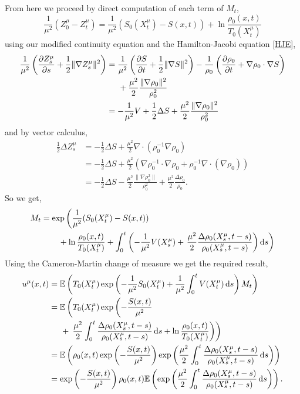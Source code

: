 \documentclass[a4paper,12pt,draft]{report}
\begin{document}
{From here we proceed by direct computation of each term of $M_t$,
$$
\frac{1}{\mu^2}(Z_0^\mu - Z_t^\mu) = \frac{1}{\mu^2}(S_0(X_t^\mu) - S(x, t)) + \ln\frac{\rho_0(x, t)}{T_0(X_t^\mu)}
$$
using our modified continuity equation and the Hamilton-Jacobi equation \eqref{HJE},
\begin{align}
\frac{1}{\mu^2}\left(\frac{\partial Z_s^\mu}{\partial s} + \frac{1}{2}\|\nabla Z_s^\mu\|^2\right) & = \frac{1}{\mu^2}\left(\frac{\partial S}{\partial t} + \frac{1}{2}\|\nabla S\|^2\right) - \frac{1}{\rho_0}\left(\frac{\partial\rho_0}{\partial t} + \nabla\rho_0\cdot\nabla S\right)\nonumber\\
& \hspace{0.5cm} + \frac{\mu^2}{2}\frac{\|\nabla\rho_0\|^2}{\rho_0^2}\nonumber\\
& = -\frac{1}{\mu^2}V + \frac{1}{2}\Delta S + \frac{\mu^2}{2}\frac{\|\nabla\rho_0\|^2}{\rho_0^2}\nonumber
\end{align}
and by vector calculus,
\begin{align}
\frac{1}{2}\Delta Z_s^\mu & = -\frac{1}{2}\Delta S + \frac{\mu^2}{2}\nabla\cdot\left(\rho_0^{-1}\nabla\rho_0\right)\nonumber\\
& = -\frac{1}{2}\Delta S + \frac{\mu^2}{2}(\nabla\rho_0^{-1}\cdot\nabla\rho_0 + \rho_0^{-1}\nabla\cdot(\nabla\rho_0))\nonumber\\
& = -\frac{1}{2}\Delta S - \frac{\mu^2}{2}\frac{\|\nabla\rho_0^2\|}{\rho_0^2} + \frac{\mu^2}{2}\frac{\Delta\rho_0}{\rho_0}.\nonumber
\end{align}
So we get,
\begin{align}
M_t & = \exp\left(\frac{1}{\mu^2}(S_0(X_t^\mu) - S(x, t))\right.\nonumber\\
& \hspace{0.75cm} + \ln\frac{\rho_0(x, t)}{T_0(X_t^\mu)} + \int_0^t\left(-\frac{1}{\mu^2}V(X_s^\mu) + \left.\frac{\mu^2}{2}\frac{\Delta\rho_0(X_s^\mu, t - s)}{\rho_0(X_s^\mu, t - s)}\right)\mathrm{d}s\right)\nonumber
\end{align}
Using the Cameron-Martin change of measure we get the required result,
\begin{align}
u^\mu(x, t) & = \mathbb{E}\left(T_0(X_t^\mu)\exp\left(-\frac{1}{\mu^2}S_0(X_t^\mu) + \frac{1}{\mu^2}\int_0^tV(X_t^\mu)\,\mathrm{d}s\right)M_t\right)\nonumber\\
& = \mathbb{E}\left(T_0(X_t^\mu)\exp\left(-\frac{S(x, t)}{\mu^2}\right.\right.\nonumber\\
& \hspace{0.5cm} + \left.\left.\frac{\mu^2}{2}\int_0^t\frac{\Delta\rho_0(X_s^\mu, t - s)}{\rho_0(X_s^\mu, t - s)}\,\mathrm{d}s + \ln\frac{\rho_0(x, t)}{T_0(X_t^\mu)}\right)\right)\nonumber\\
& = \mathbb{E}\left(\rho_0(x, t)\exp\left(-\frac{S(x, t)}{\mu^2}\right)\exp\left(\frac{\mu^2}{2}\int_0^t\frac{\Delta\rho_0(X_s^\mu, t - s)}{\rho_0(X_s^\mu, t - s)}\,\mathrm{d}s\right)\right)\nonumber\\
& = \exp\left(-\frac{S(x, t)}{\mu^2}\right)\rho_0(x, t)\mathbb{E}\left(\exp\left(\frac{\mu^2}{2}\int_0^t\frac{\Delta\rho_0(X_s^\mu, t - s)}{\rho_0(X_s^\mu, t - s)}\,\mathrm{d}s\right)\right).\nonumber
\end{align}

\qedhere
}
\end{document}
